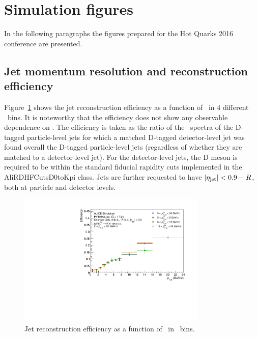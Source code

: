 \section{Simulation figures}
In the following paragraphs the figures prepared for the Hot Quarks 2016 conference are presented.
\subsection{Jet momentum resolution and reconstruction efficiency}
Figure~\ref{fig:HQ16_Simulation_EfficiencyVsDPt} shows the jet reconstruction efficiency as a function of \ptd\ in 4 different \ptchjet\ bins.
It is noteworthy that the efficiency does not show any observable dependence on \ptchjet.
The efficiency is taken as the ratio of the \ptd\ spectra of the D-tagged particle-level jets for which a matched
D-tagged detector-level jet was found overall the D-tagged particle-level jets (regardless of whether they are matched to a detector-level jet).
For the detector-level jets, the D meson is required to be within the standard fiducial rapidity cuts implemented in the AliRDHFCutsD0toKpi class.
Jets are further requested to have $|\eta_{\rm jet}| < 0.9 - R$, both at particle and detector levels.
\begin{figure}[tbh]
\begin{center}
\includegraphics[width=0.8\textwidth]{img/HQ16_Simulation_EfficiencyVsDPt}
 \caption{Jet reconstruction efficiency as a function of \ptd\ in \ptchjet\ bins.} 
 \label{fig:HQ16_Simulation_EfficiencyVsDPt}
\end{center}
\end{figure}

